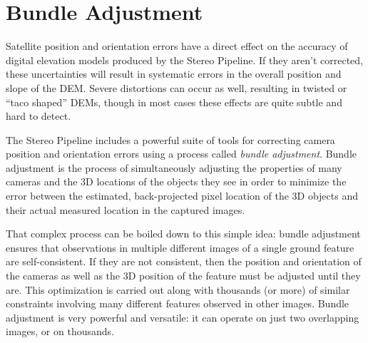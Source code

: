 \chapter{Bundle Adjustment}
\label{ch:bundle_adjustment}

Satellite position and orientation errors have a direct effect on the
accuracy of digital elevation models produced by the Stereo Pipeline.
If they aren't corrected, these uncertainties will result in
systematic errors in the overall position and slope of the DEM.  Severe
distortions can occur as well, resulting in twisted or ``taco shaped''
DEMs, though in most cases these effects are quite subtle and hard to
detect.

The Stereo Pipeline includes a powerful suite of tools for correcting
camera position and orientation errors using a process called
\emph{bundle adjustment}.  Bundle adjustment is the process of
simultaneously adjusting the properties of many cameras and the 3D
locations of the objects they see in order to minimize the error
between the estimated, back-projected pixel location of the 3D
objects and their actual measured location in the captured images.

That complex process can be boiled down to this simple idea: bundle
adjustment ensures that observations in multiple different images of a
single ground feature are self-consistent. If they are not consistent,
then the position and orientation of the cameras as well as the 3D
position of the feature must be adjusted until they are.  This
optimization is carried out along with thousands (or more) of similar
constraints involving many different features observed in other
images.  Bundle adjustment is very powerful and versatile: it can
operate on just two overlapping images, or on thousands.

